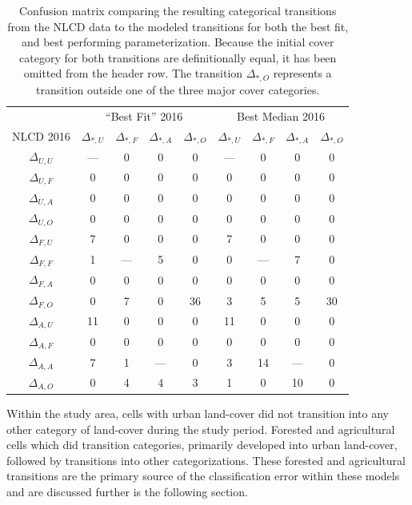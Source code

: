 \begin{table}
    \centering
    \caption{Confusion matrix comparing the resulting categorical transitions from the NLCD data to the modeled transitions
    for both the best fit, and best performing parameterization.
    Because the initial cover category for both transitions are definitionally equal,
    it has been omitted from the header row.
    The transition $\Delta_{*,O}$ represents a transition outside one of the three major cover categories.}
    \label{tab:confusion}
    \begin{tabular}{@{\extracolsep{4pt}}c|cccc|cccc@{}}
    & \multicolumn{4}{c}{``Best Fit'' 2016} & \multicolumn{4}{c}{Best Median 2016} \\ \cline{2-5}\cline{6-9}
    NLCD 2016 & $\Delta_{*,U}$ & $\Delta_{*,F}$ & $\Delta_{*,A}$ & $\Delta_{*,O}$ 
    & $\Delta_{*,U}$ & $\Delta_{*,F}$ & $\Delta_{*,A}$ & $\Delta_{*,O}$ \\ \hline
    $\Delta_{U,U}$ & --- & 0 & 0 & 0 & --- & 0 & 0 & 0 \\
    $\Delta_{U,F}$ & 0 & 0 & 0 & 0 & 0 & 0 & 0 & 0 \\
    $\Delta_{U,A}$ & 0 & 0 & 0 & 0 & 0 & 0 & 0 & 0 \\
    $\Delta_{U,O}$ & 0 & 0 & 0 & 0 & 0 & 0 & 0 & 0 \\ \hline
    $\Delta_{F,U}$ & 7 & 0 & 0 & 0 & 7 & 0 & 0 & 0 \\
    $\Delta_{F,F}$ & 1 & --- & 5 & 0 & 0 & --- & 7 & 0 \\
    $\Delta_{F,A}$ & 0 & 0 & 0 & 0 & 0 & 0 & 0 & 0\\
    $\Delta_{F,O}$ & 0 & 7 & 0 & 36 & 3 & 5 & 5 & 30 \\ \hline
    $\Delta_{A,U}$ & 11 & 0 & 0 & 0 & 11 & 0 & 0 & 0 \\
    $\Delta_{A,F}$ & 0 & 0 & 0 & 0 & 0 & 0 & 0 & 0 \\
    $\Delta_{A,A}$ & 7 & 1 & --- & 0 & 3 & 14 & --- & 0 \\
    $\Delta_{A,O}$ & 0 & 4 & 4 & 3  & 1 & 0 & 10 & 0 \\
    \end{tabular}
\end{table}

Within the study area, cells with urban land-cover did not transition into any 
other category of land-cover during the study period.
Forested and agricultural cells which did transition categories,
primarily developed into urban land-cover, followed by
transitions into other categorizations.
These forested and agricultural transitions are the primary source of
the classification error within these models and are discussed further
is the following section.

